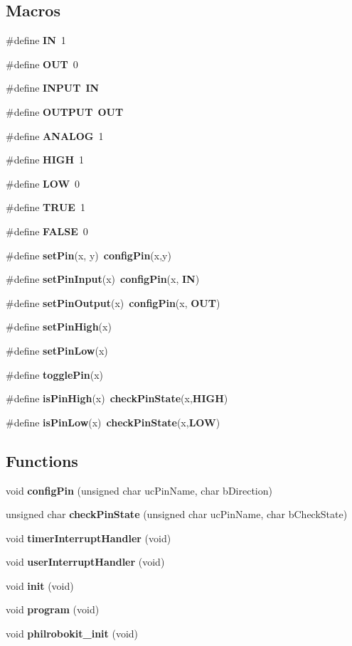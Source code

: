 \subsection*{Macros}
\begin{DoxyCompactItemize}
\item 
\#define {\bf I\-N}~1
\item 
\#define {\bf O\-U\-T}~0
\item 
\#define {\bf I\-N\-P\-U\-T}~{\bf I\-N}
\item 
\#define {\bf O\-U\-T\-P\-U\-T}~{\bf O\-U\-T}
\item 
\#define {\bf A\-N\-A\-L\-O\-G}~1
\item 
\#define {\bf H\-I\-G\-H}~1
\item 
\#define {\bf L\-O\-W}~0
\item 
\#define {\bf T\-R\-U\-E}~1
\item 
\#define {\bf F\-A\-L\-S\-E}~0
\item 
\#define {\bf set\-Pin}(x, y)~{\bf config\-Pin}(x,y)
\item 
\#define {\bf set\-Pin\-Input}(x)~{\bf config\-Pin}(x, {\bf I\-N})
\item 
\#define {\bf set\-Pin\-Output}(x)~{\bf config\-Pin}(x, {\bf O\-U\-T})
\item 
\#define {\bf set\-Pin\-High}(x)
\item 
\#define {\bf set\-Pin\-Low}(x)
\item 
\#define {\bf toggle\-Pin}(x)
\item 
\#define {\bf is\-Pin\-High}(x)~{\bf check\-Pin\-State}(x,{\bf H\-I\-G\-H})
\item 
\#define {\bf is\-Pin\-Low}(x)~{\bf check\-Pin\-State}(x,{\bf L\-O\-W})
\end{DoxyCompactItemize}
\subsection*{Functions}
\begin{DoxyCompactItemize}
\item 
void {\bf config\-Pin} (unsigned char uc\-Pin\-Name, char b\-Direction)
\item 
unsigned char {\bf check\-Pin\-State} (unsigned char uc\-Pin\-Name, char b\-Check\-State)
\item 
void {\bf timer\-Interrupt\-Handler} (void)
\item 
void {\bf user\-Interrupt\-Handler} (void)
\item 
void {\bf init} (void)
\item 
void {\bf program} (void)
\item 
void {\bf philrobokit\-\_\-init} (void)
\end{DoxyCompactItemize}


